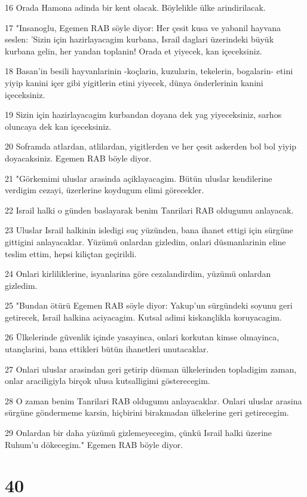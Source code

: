 \par 16 Orada Hamona adinda bir kent olacak. Böylelikle ülke arindirilacak.
\par 17 "Insanoglu, Egemen RAB söyle diyor: Her çesit kusa ve yabanil hayvana seslen: 'Sizin için hazirlayacagim kurbana, Israil daglari üzerindeki büyük kurbana gelin, her yandan toplanin! Orada et yiyecek, kan içeceksiniz.
\par 18 Basan'in besili hayvanlarinin -koçlarin, kuzularin, tekelerin, bogalarin- etini yiyip kanini içer gibi yigitlerin etini yiyecek, dünya önderlerinin kanini içeceksiniz.
\par 19 Sizin için hazirlayacagim kurbandan doyana dek yag yiyeceksiniz, sarhos oluncaya dek kan içeceksiniz.
\par 20 Soframda atlardan, atlilardan, yigitlerden ve her çesit askerden bol bol yiyip doyacaksiniz. Egemen RAB böyle diyor.
\par 21 "Görkemimi uluslar arasinda açiklayacagim. Bütün uluslar kendilerine verdigim cezayi, üzerlerine koydugum elimi görecekler.
\par 22 Israil halki o günden baslayarak benim Tanrilari RAB oldugumu anlayacak.
\par 23 Uluslar Israil halkinin isledigi suç yüzünden, bana ihanet ettigi için sürgüne gittigini anlayacaklar. Yüzümü onlardan gizledim, onlari düsmanlarinin eline teslim ettim, hepsi kiliçtan geçirildi.
\par 24 Onlari kirliliklerine, isyanlarina göre cezalandirdim, yüzümü onlardan gizledim.
\par 25 "Bundan ötürü Egemen RAB söyle diyor: Yakup'un sürgündeki soyunu geri getirecek, Israil halkina aciyacagim. Kutsal adimi kiskançlikla koruyacagim.
\par 26 Ülkelerinde güvenlik içinde yasayinca, onlari korkutan kimse olmayinca, utançlarini, bana ettikleri bütün ihanetleri unutacaklar.
\par 27 Onlari uluslar arasindan geri getirip düsman ülkelerinden topladigim zaman, onlar araciligiyla birçok ulusa kutsalligimi gösterecegim.
\par 28 O zaman benim Tanrilari RAB oldugumu anlayacaklar. Onlari uluslar arasina sürgüne göndermeme karsin, hiçbirini birakmadan ülkelerine geri getirecegim.
\par 29 Onlardan bir daha yüzümü gizlemeyecegim, çünkü Israil halki üzerine Ruhum'u dökecegim." Egemen RAB böyle diyor.

\chapter{40}

